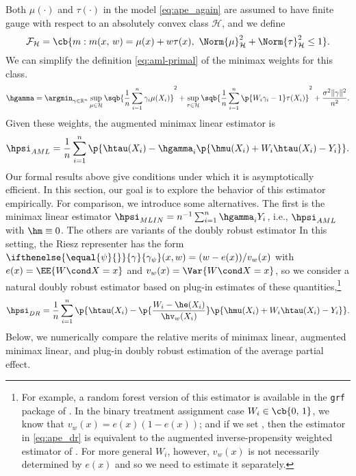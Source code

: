 \documentclass[aos,submission]{imsart}
\theoremstyle{plain}
\theoremstyle{remark}
\newcommand{\riesz}[1][]{\ifthenelse{\equal{#1}{}}{\gamma}{\gamma_{{#1}}}}
\newcommand{\HH}{\mathcal{H}}
\DeclarePairedDelimiter\norm{\lVert}{\rVert}
\newcommand{\R}{\mathbb{R}}
\newcommand{\F}{\mathcal{F}}
\begin{document}
Both $\mu(\cdot)$ and $\tau(\cdot)$ in the model \eqref{eq:ape_again} are assumed to have
finite gauge with respect to an absolutely convex class $\HH$, and we define
\begin{equation}
\label{eq:F_ape}
\F_{\HH} = \cb{m : m(x, \, w) = \mu(x) + w \tau(x), \ \Norm{\mu}_\HH^2 + \Norm{\tau}_\HH^2 \leq 1}.
\end{equation}
We can simplify the definition \eqref{eq:aml-primal} of the minimax weights for this class. 
\begin{equation}
\label{eq:ape_gamma}
\begin{split}
\hgamma = \argmin_{\gamma \in \R^n}
\sup_{\mu \in \HH}\sqb{\frac{1}{n} \sum_{i = 1}^n \gamma_i \mu(X_i)}^2 
+ \sup_{\tau \in \HH}\sqb{\frac{1}{n} \sum_{i = 1}^n \p{W_i\gamma_i - 1} \tau(X_i)}^2 + \frac{\sigma^2 \norm{\gamma}^2}{n^2}.
\end{split}
\end{equation}
Given these weights, the augmented minimax linear estimator is  
\begin{equation}
\label{eq:ape_aml}
\hpsi_{AML} = \frac{1}{n} \sum_{i = 1}^n \p{\htau(X_i) - \hgamma_i \p{\hmu(X_i) + W_i \htau(X_i) - Y_i}}.
\end{equation}
Our formal results above give conditions under which it is asymptotically efficient.
In this section, our goal is to explore the behavior of this estimator empirically.
For comparison, we introduce some alternatives.
The first is the minimax linear estimator $\hpsi_{MLIN} = n^{-1}\sum_{i=1}^n \hgamma_i Y_i$,
i.e., $\hpsi_{AML}$ with $\hm \equiv 0$.
The others are variants of the doubly robust estimator 
In this setting, the Riesz representer has the form $\riesz[\psi](x, w) = (w - e(x)) / v_w(x)$ with
$e(x) = \EE{W \cond X = x}$ and $v_w(x) = \Var{W \cond X = x}$, so we consider 
a natural doubly robust estimator based on plug-in estimates of these quantities,\footnote{For example,
a random forest version of this estimator is available in the \texttt{grf} package of
\citet*{athey2016generalized}. In the binary treatment assignment case $W_i \in \cb{0, \, 1}$,
we know that $v_w(x) = e(x)(1 - e(x))$; and if we set , then the estimator
in \eqref{eq:ape_dr} is equivalent to the augmented inverse-propensity weighted estimator of
\citet*{robins1994estimation}. For more general $W_i$, however, $v_w(x)$ is not necessarily determined by $e(x)$
and so we need to estimate it separately.}
\begin{equation}
\label{eq:ape_dr}
\hpsi_{DR} = \frac{1}{n} \sum_{i = 1}^n \p{\htau(X_i) - \p{\frac{W_i - \he(X_i)}{\hv_w(X_i)}} \p{\hmu(X_i) + W_i \htau(X_i) - Y_i}}.
\end{equation}
Below, we numerically compare the relative merits of minimax linear, augmented
minimax linear, and plug-in doubly robust estimation of the average partial effect.
\end{document}
